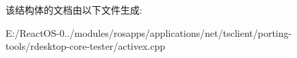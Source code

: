 该结构体的文档由以下文件生成\+:\begin{DoxyCompactItemize}
\item 
E\+:/\+React\+O\+S-\/0../modules/rosapps/applications/net/tsclient/porting-\/tools/rdesktop-\/core-\/tester/activex.\+cpp\end{DoxyCompactItemize}
